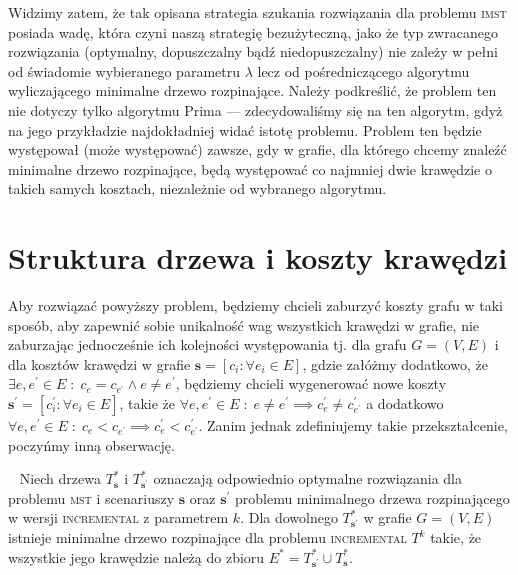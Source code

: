Widzimy zatem, że tak opisana strategia szukania rozwiązania dla problemu \textsc{imst} posiada wadę, która czyni naszą strategię bezużyteczną, jako że typ zwracanego rozwiązania (optymalny, dopuszczalny bądź niedopuszczalny) nie zależy w pełni od świadomie wybieranego parametru $\lambda$ lecz od pośredniczącego algorytmu wyliczającego minimalne drzewo rozpinające. Należy podkreślić, że problem ten nie dotyczy tylko algorytmu Prima --- zdecydowaliśmy się na ten algorytm, gdyż na jego przykładzie najdokładniej widać istotę problemu. Problem ten będzie występował (może występować) zawsze, gdy w grafie, dla którego chcemy znaleźć minimalne drzewo rozpinające, będą występować co najmniej dwie krawędzie o takich samych kosztach, niezależnie od wybranego algorytmu.

\section{Struktura drzewa i koszty krawędzi}

Aby rozwiązać powyższy problem, będziemy chcieli zaburzyć koszty grafu w taki sposób, aby zapewnić sobie unikalność wag wszystkich krawędzi w grafie, nie zaburzając jednocześnie ich kolejności występowania tj. dla grafu $G = \left(V, E \right)$ i dla kosztów krawędzi w grafie $\textbf{s} = \left[ c_{i} : \forall e_{i} \in E \right]$, gdzie załóżmy dodatkowo, że $\exists e, e^{\prime} \in E \; : \; c_{e} = c_{e^{\prime}} \wedge e \neq e^{\prime}$, będziemy chcieli wygenerować nowe koszty $\textbf{s}^{\prime} = \left[ c^{\prime}_{i} : \forall e_{i} \in E \right]$, takie że $\forall e, e^{\prime} \in E \; : \; e \neq e^{\prime} \implies c^{\prime}_{e} \neq c^{\prime}_{e^{\prime}}$ a dodatkowo $\forall e, e^{\prime} \in E \; : \; c_{e} < c_{e^{\prime}} \implies c^{\prime}_{e} < c^{\prime}_{e^{\prime}}$. Zanim jednak zdefiniujemy takie przekształcenie, poczyńmy inną obserwację.

\begin{lemma}~\cite{incNetOpt}\label{lm:shrunkenGraph}
	Niech drzewa $T^{\ast}_{\textbf{s}}$ i $T^{\ast}_{\textbf{s}^{\prime}}$ oznaczają odpowiednio optymalne rozwiązania dla problemu \textsc{mst} i scenariuszy $\textbf{s}$ oraz $\textbf{s}^{\prime}$ problemu minimalnego drzewa rozpinającego w wersji \textsc{incremental} z parametrem $k$. Dla dowolnego $T^{\ast}_{\textbf{s}^{\prime}}$ w grafie $G = \left( V, E \right)$ istnieje minimalne drzewo rozpinające dla problemu \textsc{incremental} $T^{k}$ takie, że wszystkie jego krawędzie należą do zbioru $E^{\ast} = T^{\ast}_{\textbf{s}^{\prime}} \cup T^{\ast}_{\textbf{s}}$.
\end{lemma}

